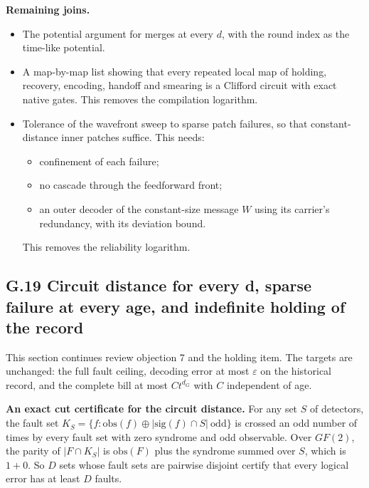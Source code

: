 \documentclass[
]{article}
\providecommand{\tightlist}{%
  \setlength{\itemsep}{0pt}\setlength{\parskip}{0pt}}
\begin{document}
\textbf{Remaining joins.}

\begin{itemize}
\tightlist
\item
  The potential argument for merges at every \(d\), with the round index
  as the time-like potential.
\item
  A map-by-map list showing that every repeated local map of holding,
  recovery, encoding, handoff and smearing is a Clifford circuit with
  exact native gates. This removes the compilation logarithm.
\item
  Tolerance of the wavefront sweep to sparse patch failures, so that
  constant-distance inner patches suffice. This needs:

  \begin{itemize}
  \tightlist
  \item
    confinement of each failure;
  \item
    no cascade through the feedforward front;
  \item
    an outer decoder of the constant-size message \(W\) using its
    carrier's redundancy, with its deviation bound.
  \end{itemize}

  This removes the reliability logarithm.
\end{itemize}

\subsection{G.19 Circuit distance for every d, sparse failure at every
age, and indefinite holding of the
record}\label{g.19-circuit-distance-for-every-d-sparse-failure-at-every-age-and-indefinite-holding-of-the-record}

This section continues review objection 7 and the holding item. The
targets are unchanged: the full fault ceiling, decoding error at most
\(\varepsilon\) on the historical record, and the complete bill at most
\(Ct^{d_G}\) with \(C\) independent of age.

\textbf{An exact cut certificate for the circuit distance.} For any set
\(S\) of detectors, the fault set
\(K_S=\{f:\mathrm{obs}(f)\oplus|\mathrm{sig}(f)\cap S|\ \text{odd}\}\)
is crossed an odd number of times by every fault set with zero syndrome
and odd observable. Over \(GF(2)\), the parity of \(|F\cap K_S|\) is
\(\mathrm{obs}(F)\) plus the syndrome summed over \(S\), which is
\(1+0\). So \(D\) sets whose fault sets are pairwise disjoint certify
that every logical error has at least \(D\) faults.
\end{document}
